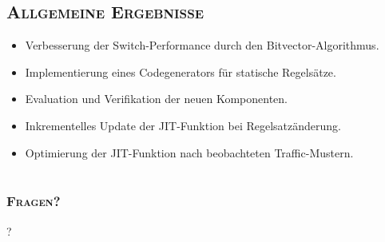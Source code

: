 \documentclass[xcolor=x11names,compress]{beamer}
\renewcommand{\(}{\begin{columns}}
\renewcommand{\)}{\end{columns}}
\newcommand{\<}[1]{\begin{column}{#1}}
\renewcommand{\>}{\end{column}}
\begin{document}
\subsection{\scshape Allgemeine Ergebnisse}
\begin{frame}
  \begin{tcolorbox}[colback=teal!5!white,colframe=teal!75!black,title=Wichtigste Ergebnisse,drop fuzzy shadow]
    \begin{itemize}
      \item Verbesserung der Switch-Performance durch den Bitvector-Algorithmus.
      \item Implementierung eines Codegenerators für statische Regelsätze.
      \item Evaluation und Verifikation der neuen Komponenten.
    \end{itemize}
  \end{tcolorbox}
  \pause
  \begin{tcolorbox}[colback=blue!5!white,colframe=blue!75!black,title=Künftige Anknüpfungspunkte,drop fuzzy shadow]
    \begin{itemize}
      \item Inkrementelles Update der JIT-Funktion bei Regelsatzänderung.
      \item Optimierung der JIT-Funktion nach beobachteten Traffic-Mustern.
    \end{itemize}
  \end{tcolorbox}
\end{frame}

\section{}
\begin{frame}
  \frametitle{\scshape Fragen?}
  \centering\Huge{?}
\end{frame}

\appendix
\end{document}
